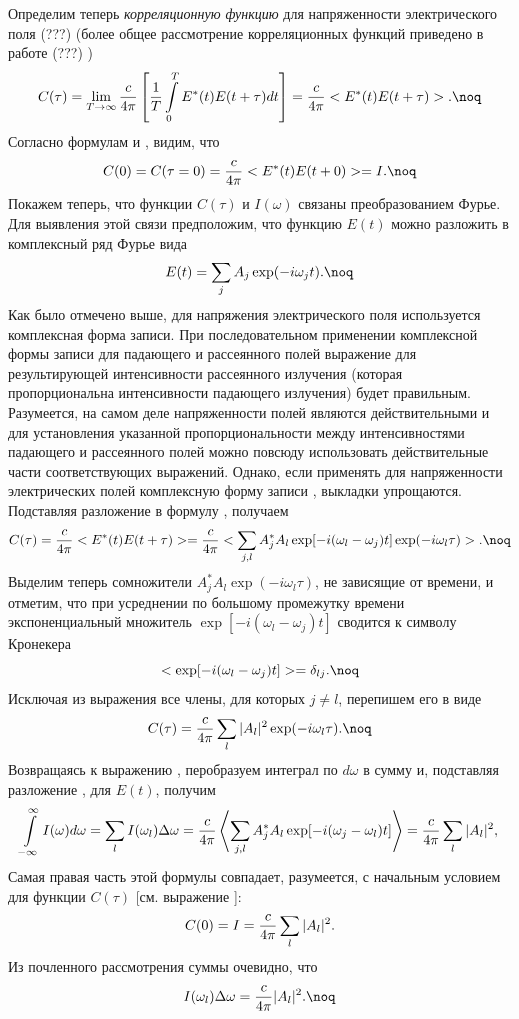 Определим теперь {\it корреляционную функцию} для напряженности
электрического поля  (???)  (более общее рассмотрение корреляционных
функций приведено в работе  (???) )
$$C(\tau)=\lim\limits_{T\rightarrow\infty}{c\over4\pi}\left[{1\over
T}\int\limits_{0}^{T}E^*(t)E(t+\tau)dt\right]=
{c\over4\pi}<E^*(t)E(t+\tau)>.\noq$$
Согласно формулам  и , видим, что
$$C(0)=C(\tau=0)={c\over4\pi}<E^*(t)E(t+0)>=I.\noq$$
Покажем теперь, что функции $C(\tau)$ и $I(\omega)$
связаны преобразованием Фурье. Для выявления этой связи
предположим, что функцию $E(t)$
можно разложить в комплексный ряд Фурье вида
$$E(t)=\sum\limits_{j}A_j\exp(-i\omega_jt).\noq$$
Как было отмечено выше, для напряжения электрического поля
используется комплексная форма записи.
При последовательном применении комплексной формы записи для
падающего и рассеянного полей выражение для результирующей
интенсивности рассеянного излучения (которая пропорциональна
интенсивности падающего излучения) будет правильным. Разумеется,
на самом деле напряженности полей являются действительными и для
установления указанной пропорциональности между интенсивностями
падающего и рассеянного полей можно повсюду использовать
действительные части соответствующих выражений. Однако, если
применять для напряженности электрических полей комплексную форму
записи , выкладки упрощаются. Подставляя разложение
в формулу , получаем
$$C(\tau)={c\over4\pi}<E^*(t)E(t+\tau)>=
{c\over4\pi}<\sum\limits_{j,l}A_{j}^*A_{l}
\exp[-i(\omega_l-\omega_j)t]\exp(-i\omega_l\tau)>.\noq$$
Выделим теперь сомножители $A_j^*A_l\exp(-i\omega_l\tau)$, не зависящие от
времени, и отметим, что при усреднении по большому промежутку
времени экспоненциальный множитель $\exp[-i(\omega_l-\omega_j)t]$ сводится
к символу Кронекера
$$<\exp[-i(\omega_l-\omega_j)t]>=\delta_{lj}.\noq$$
Исключая из выражения  все члены, для которых $j\not=l$, перепишем
его в виде
$$C(\tau)={c\over4\pi}\sum\limits_{l}|A_l|^2\exp(-i\omega_l\tau).\noq$$
Возвращаясь к выражению , перобразуем интеграл по $d\omega$
в сумму и, подставляя разложение , для $E(t)$, получим
$$\int\limits_{-\infty}^{\infty}I(\omega)d\omega=\sum\limits_{l}I(\omega_l)\Delta
\omega={c\over4\pi}\left<\sum\limits_{j,l}A_j^*A_l\exp[-i(\omega_j-\omega_l)t]\right>=
{c\over4\pi}\sum\limits_{l}|A_l|^2,$$
Самая правая часть этой формулы совпадает, разумеется, с
начальным условием для функции $C(\tau)$ [см. выражение
]:
$$C(0)=I={c\over4\pi}\sum\limits_{l}|A_l|^2.$$
Из почленного рассмотрения суммы очевидно, что
$$I(\omega_l)\Delta \omega={c\over4\pi}|A_l|^2.\noq$$
